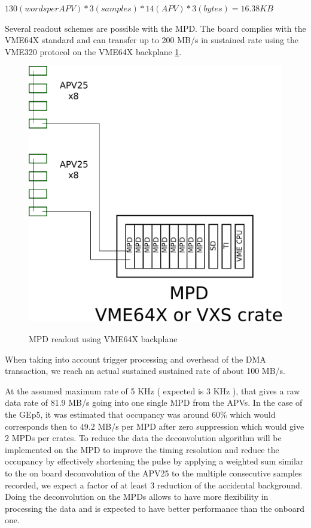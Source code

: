 \documentclass{article}
\begin{document}
$130 ( words per APV ) * 3 (samples ) * 14 (APV ) * 3 (bytes ) = 16.38 KB $

Several readout schemes are possible with the MPD. The board complies with the VME64X standard and can transfer up to 200 MB/s in sustained rate using the VME320 protocol on the VME64X backplane \ref{OldMPD}. 

\begin{figure}
\includegraphics[scale=0.55]{figs/OldMPD.pdf}\\
\caption{MPD readout using VME64X backplane}
\label{OldMPD}
\end{figure}
When taking into account trigger processing and overhead of the DMA transaction, we reach an actual sustained sustained rate of about 100 MB/s.

At the assumed maximum rate of 5 KHz ( expected is 3 KHz ), that gives a raw data rate of 81.9 MB/s going into one single MPD from the APVs.
In the case of the GEp5, it was estimated that occupancy was around 60\% which would corresponds then to 49.2 MB/s per MPD after zero suppression which would give 2 MPDs per crates. 
To reduce the data the deconvolution algorithm will be implemented on the MPD to improve the timing resolution and reduce the occupancy by effectively shortening the pulse by applying a weighted sum similar to the on board deconvolution of the APV25 \cite{French:2001xb} to the multiple consecutive samples recorded, we expect a factor of at least 3 reduction of the accidental background. Doing the deconvolution on the MPDs allows to have more flexibility in processing the data and is expected to have better performance than the onboard one.
\end{document}
